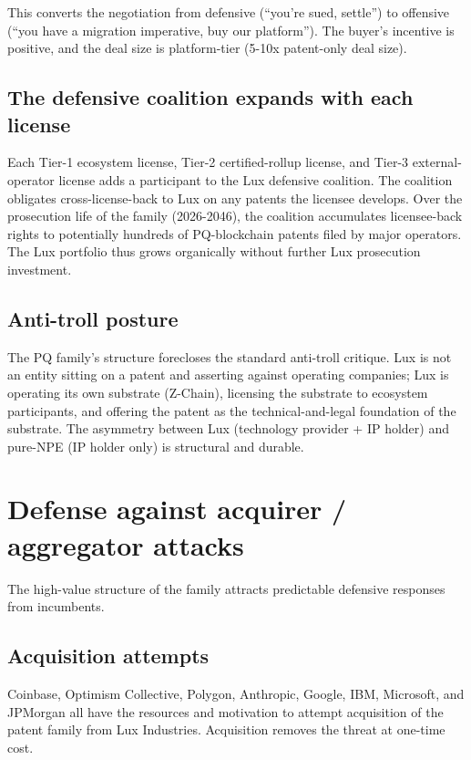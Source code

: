 \documentclass[11pt,letterpaper]{article}
\begin{document}
This converts the negotiation from defensive (``you're sued, settle'') to offensive (``you have a migration imperative, buy our platform''). The buyer's incentive is positive, and the deal size is platform-tier (5-10x patent-only deal size).

\subsection{The defensive coalition expands with each license}

Each Tier-1 ecosystem license, Tier-2 certified-rollup license, and Tier-3 external-operator license adds a participant to the Lux defensive coalition. The coalition obligates cross-license-back to Lux on any patents the licensee develops. Over the prosecution life of the family (2026-2046), the coalition accumulates licensee-back rights to potentially hundreds of PQ-blockchain patents filed by major operators. The Lux portfolio thus grows organically without further Lux prosecution investment.

\subsection{Anti-troll posture}

The PQ family's structure forecloses the standard anti-troll critique. Lux is not an entity sitting on a patent and asserting against operating companies; Lux is operating its own substrate (Z-Chain), licensing the substrate to ecosystem participants, and offering the patent as the technical-and-legal foundation of the substrate. The asymmetry between Lux (technology provider + IP holder) and pure-NPE (IP holder only) is structural and durable.

\section{Defense against acquirer / aggregator attacks}

The high-value structure of the family attracts predictable defensive responses from incumbents.

\subsection{Acquisition attempts}

Coinbase, Optimism Collective, Polygon, Anthropic, Google, IBM, Microsoft, and JPMorgan all have the resources and motivation to attempt acquisition of the patent family from Lux Industries. Acquisition removes the threat at one-time cost.
\end{document}
